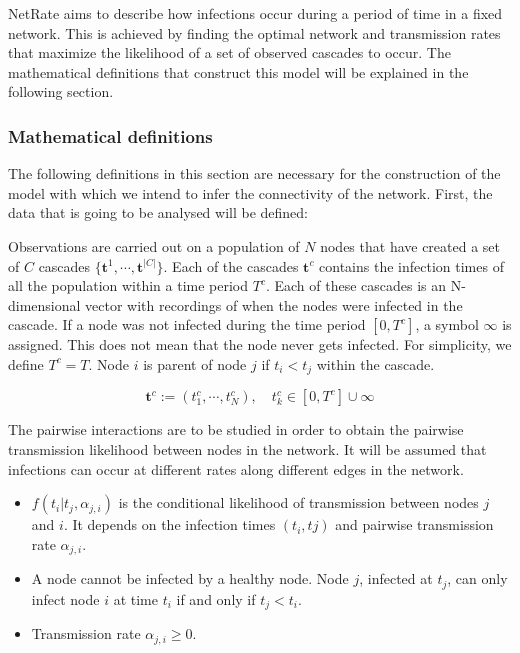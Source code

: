 \documentclass[11pt]{article}
\begin{document}
NetRate aims to describe how infections occur during a period of time in a fixed network. This is achieved by finding the optimal network and transmission rates that maximize the likelihood of a set of observed cascades to occur. The mathematical definitions that construct this model will be explained in the following section.


\subsubsection{Mathematical definitions}

The following definitions in this section are necessary for the construction of the model with which we intend to infer the connectivity of the network. First, the data that is going to be analysed will be defined:

Observations are carried out on a population of $N$ nodes that have created a set of $C$ cascades $\{\textbf{t}^{1},\cdots,\textbf{t}^{|C|}\}$. Each of the cascades $\textbf{t}^{c}$ contains the infection times of all the population within a time period $T^{c}$. Each of these cascades is an N-dimensional vector with recordings of when the nodes were infected in the cascade. If a node was not infected during the time period $[0,T^{c}]$, a symbol $\infty$ is assigned. This does not mean that the node never gets infected. For simplicity, we define $T^{c}=T$. Node $i$ is parent of node $j$ if $t_{i}<t_{j}$ within the cascade.


\begin{equation}\label{eq:data_netrate}
\textbf{t}^{c}:=(t_{1}^{c},\cdots,t_{N}^{c}),\quad t_{k}^{c}\in [0,T^{c}]\cup{\infty}
\end{equation}

The pairwise interactions are to be studied in order to obtain the pairwise transmission likelihood between nodes in the network. It will be assumed that infections can occur at different rates along different edges in the network. 

\begin{itemize}
\item $f(t_{i}|t_{j},\alpha _{j,i})$ is the conditional likelihood of transmission between nodes $j$ and $i$. It depends on the infection times $(t_{i},t{j})$ and pairwise transmission rate $\alpha_{j,i}$.
\item A node cannot be infected by a healthy node. Node $j$, infected at $t_{j}$, can only infect node $i$ at time $t_{i}$ if and only if $t_{j}<t_{i}$.
\item Transmission rate $\alpha _{j,i}\geq0$.
\end{itemize}
\end{document}
